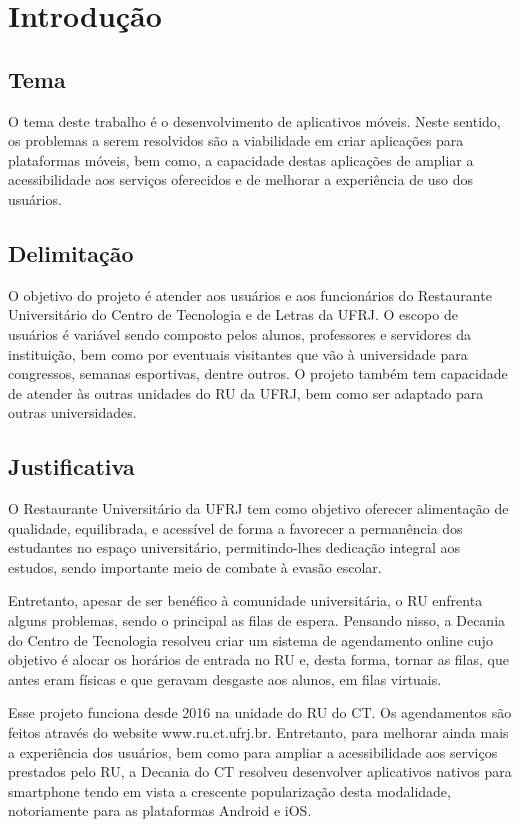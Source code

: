 \chapter{Introdução}
\section{Tema}

O tema deste trabalho é o desenvolvimento de aplicativos móveis. Neste sentido, os problemas a serem 
resolvidos são a viabilidade em criar aplicações para plataformas móveis, 
bem como,  a capacidade destas aplicações de ampliar a acessibilidade aos serviços 
oferecidos e de melhorar a experiência de uso dos usuários.

\section{Delimitação}

O objetivo do projeto é atender aos usuários e aos funcionários do Restaurante 
Universitário do Centro de Tecnologia e de Letras da UFRJ. O escopo de usuários é variável sendo 
composto pelos alunos, professores e servidores da instituição, bem como por eventuais visitantes que 
vão à universidade para congressos, semanas esportivas, dentre outros. O projeto também tem 
capacidade de atender às outras unidades do RU da UFRJ, bem como ser adaptado para outras 
universidades.

\section{Justificativa}

O Restaurante Universitário da UFRJ tem como objetivo oferecer alimentação de qualidade, equilibrada, e 
acessível de forma a favorecer a permanência dos estudantes no espaço universitário, permitindo-lhes 
dedicação integral aos estudos, sendo importante meio de combate à evasão escolar.

Entretanto, apesar de ser benéfico à comunidade universitária, o RU enfrenta alguns problemas, sendo o 
principal as filas de espera. Pensando nisso, a Decania do Centro de Tecnologia resolveu criar um sistema
 de agendamento online cujo objetivo é alocar os horários de entrada no RU e, desta forma, tornar as 
 filas, que antes eram físicas e que geravam desgaste aos alunos, em filas virtuais.

Esse projeto funciona desde 2016 na unidade do RU do CT. Os agendamentos são feitos através do website
www.ru.ct.ufrj.br. Entretanto, para melhorar ainda mais a experiência dos usuários, bem 
como para ampliar a acessibilidade aos serviços prestados pelo RU, a Decania do CT 
resolveu desenvolver aplicativos nativos para smartphone tendo em vista a crescente popularização desta 
modalidade, notoriamente para as plataformas Android e iOS.


